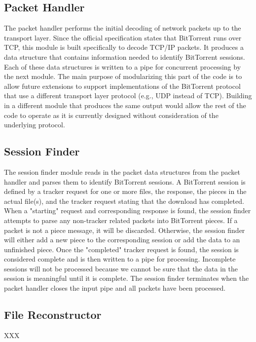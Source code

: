 \documentclass{acm_proc_article-sp}
\begin{document}
\subsection{Packet Handler}
The packet handler performs the initial decoding of network packets up to the
transport layer. Since the official specification states that BitTorrent runs
over TCP, this module is built specifically to decode TCP/IP packets. It 
produces a data structure that contains information needed to identify 
BitTorrent sessions. Each of these data structures is written to a pipe for 
concurrent processing by the next module. The main purpose of modularizing this 
part of the code is to allow future extensions to support implementations of 
the BitTorrent protocol that use a different transport layer protocol 
(e.g., UDP instead of TCP). Building in a different module that produces the
same output would allow the rest of the code to operate as it is currently
designed without consideration of the underlying protocol.

\subsection{Session Finder}
The session finder module reads in the packet data structures from the packet
handler and parses them to identify BitTorrent sessions. A BitTorrent session is
defined by a tracker request for one or more files, the response, the pieces in
the actual file(s), and the tracker request stating that the download has
completed. When a "starting" request and corresponding response is found, the
session finder attempts to parse any non-tracker related packets into BitTorrent
pieces. If a packet is not a piece message, it will be discarded. Otherwise, the
session finder will either add a new piece to the corresponding session or add
the data to an unfinished piece. Once the "completed" tracker request is found,
the session is considered complete and is then written to a pipe for
processing. Incomplete sessions will not be processed because we cannot be sure
that the data in the session is meaningful until it is complete. The session
finder terminates when the packet handler closes the input pipe and all packets
have been processed.

\subsection{File Reconstructor}
XXX
\end{document}
